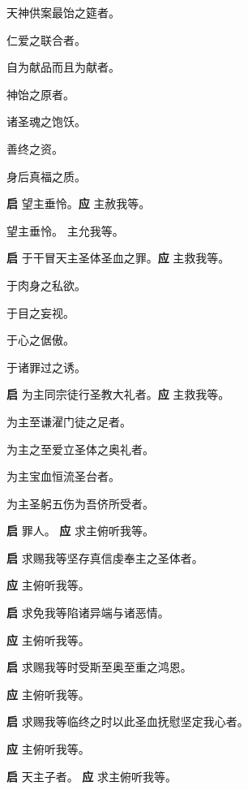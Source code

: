 \documentclass[UTF8,17pt]{ctexart}
\begin{document}
 天神供案最饴之筵者。

 仁爱之联合者。

 ⾃为献品⽽且为献者。

 神饴之原者。

 诸圣魂之饱饫。

 善终之资。

 ⾝后真福之质。

\textbf{启} \quad 望主垂怜。\hfill \textbf{应} \quad 主赦我等。

 望主垂怜。\hfill {} 主允我等。

\textbf{启} \quad 于干冒天主圣体圣⾎之罪。\hfill \textbf{应} \quad 主救我等。

 于⾁⾝之私欲。

 于⽬之妄视。

 于⼼之倨傲。

 于诸罪过之诱。

\textbf{启} \quad 为主同宗徒⾏圣教⼤礼者。\hfill \textbf{应} \quad 主救我等。

 为主⾄谦濯门徒之⾜者。

 为主之⾄爱⽴圣体之奥礼者。

 为主宝⾎恒流圣台者。

 为主圣躬五伤为吾侪所受者。

\textbf{启} \quad 罪⼈。 \hfill \textbf{应} \quad 求主俯听我等。

\textbf{启} \quad 求赐我等坚存真信虔奉主之圣体者。 

\textbf{应} \quad 主俯听我等。

\textbf{启} \quad 求免我等陷诸异端与诸恶情。

\textbf{应} \quad 主俯听我等。

\textbf{启} \quad 求赐我等时受斯⾄奥⾄重之鸿恩。

\textbf{应} \quad 主俯听我等。

\textbf{启} \quad 求赐我等临终之时以此圣⾎抚慰坚定我⼼者。

\textbf{应} \quad 主俯听我等。

\textbf{启} \quad 天主⼦者。 \hfill \textbf{应} \quad 求主俯听我等。
\end{document}
